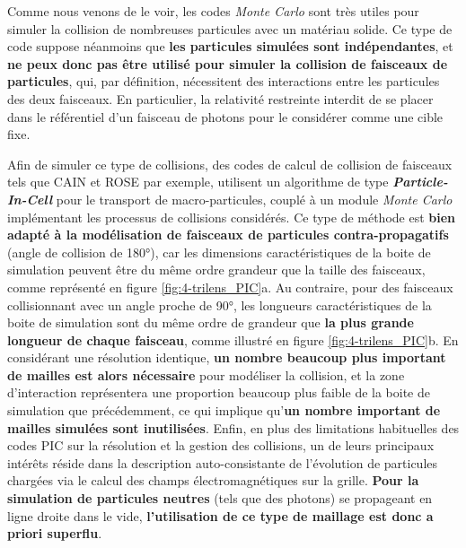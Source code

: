 \begin{refsection}
Comme nous venons de le voir, les codes \textit{Monte Carlo} sont très utiles pour simuler la collision de nombreuses particules avec un matériau solide. Ce type de code suppose néanmoins que \textbf{les particules simulées sont indépendantes}, et \textbf{ne peux donc pas être utilisé pour simuler la collision de faisceaux de particules}, qui, par définition, nécessitent des interactions entre les particules des deux faisceaux. En particulier, la relativité restreinte interdit de se placer dans le référentiel d'un faisceau de photons pour le considérer comme une cible fixe.

Afin de simuler ce type de collisions, des codes de calcul de collision de faisceaux tels que CAIN \parencite{chen_1995} et ROSE \parencite{drebot_2017} par exemple, utilisent un algorithme de type \textbf{\textit{Particle-In-Cell}} pour le transport de macro-particules, couplé à un module \textit{Monte Carlo} implémentant les processus de collisions considérés. Ce type de méthode est \textbf{bien adapté à la modélisation de faisceaux de particules contra-propagatifs} (angle de collision de 180°), car les dimensions caractéristiques de la boite de simulation peuvent être du même ordre grandeur que la taille des faisceaux, comme représenté en figure \ref{fig:4-trilens_PIC}a. Au contraire, pour des faisceaux collisionnant avec un angle proche de 90°, les longueurs caractéristiques de la boite de simulation sont du même ordre de grandeur que \textbf{la plus grande longueur de chaque faisceau}, comme illustré en figure \ref{fig:4-trilens_PIC}b. En considérant une résolution identique, \textbf{un nombre beaucoup plus important de mailles est alors nécessaire} pour modéliser la collision, et la zone d'interaction représentera une proportion beaucoup plus faible de la boite de simulation que précédemment, ce qui implique qu'\textbf{un nombre important de mailles simulées sont inutilisées}. Enfin, en plus des limitations habituelles des codes PIC sur la résolution et la gestion des collisions, un de leurs principaux intérêts réside dans la description auto-consistante de l'évolution de particules chargées via le calcul des champs électromagnétiques sur la grille. \textbf{Pour la simulation de particules neutres} (tels que des photons) se propageant en ligne droite dans le vide, \textbf{l'utilisation de ce type de maillage est donc a priori superflu}.


\end{refsection}
